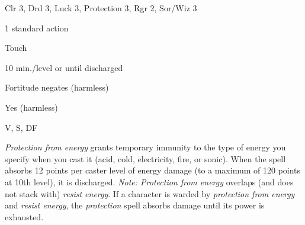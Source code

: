
\begin{description*}
\item[Level:] Clr 3, Drd 3, Luck 3, Protection 3, Rgr 2, Sor/Wiz 3
\item[Casting Time:] 1 standard action
\item[Range:] Touch
\item[Duration:] 10 min./level or until discharged
\item[Saving Throw:] Fortitude negates (harmless)
\item[Spell Resistance:] Yes (harmless)
\item[Components:] V, S, DF
\end{description*}

\textit{Protection from energy} grants temporary immunity to the type of energy
you specify when you cast it (acid, cold, electricity, fire, or sonic). When the
spell absorbs 12 points per caster level of energy damage (to a maximum of 120
points at 10th level), it is discharged.
\textit{Note: Protection from energy} overlaps (and does not stack with) \textit{resist
energy}. If a character is warded by \textit{protection from energy} and \textit{resist
energy}, the \textit{protection} spell absorbs damage until its power is exhausted.
